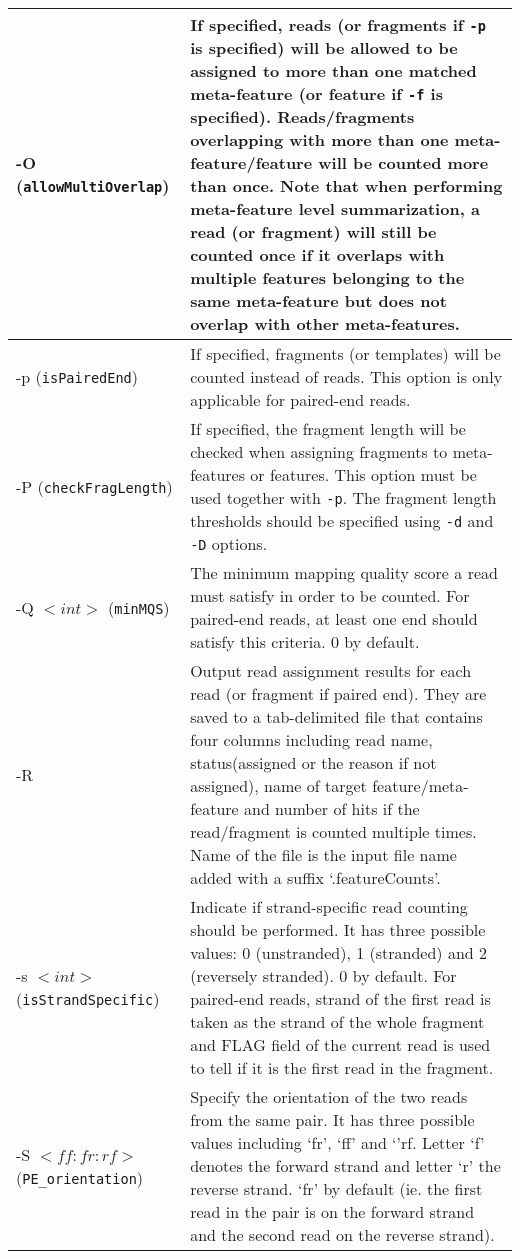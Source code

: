 \documentclass[12pt]{report}
\newcommand{\code}[1]{{\small\texttt{#1}}}
\begin{document}
\begin{longtable}{|p{5cm}|p{11cm}|}
\hline
-O \newline (\code{allowMultiOverlap}) & If specified, reads (or fragments if \code{-p} is specified) will be allowed to be assigned to more than one matched meta-feature (or feature if \code{-f} is specified). Reads/fragments overlapping with more than one meta-feature/feature will be counted more than once. Note that when performing meta-feature level summarization, a read (or fragment) will still be counted once if it overlaps with multiple features belonging to the same meta-feature but does not overlap with other meta-features. \\
\hline
-p \newline (\code{isPairedEnd}) & If specified, fragments (or templates) will be counted instead of reads. This option is only applicable for paired-end reads.\\
\hline
-P \newline (\code{checkFragLength}) & If specified, the fragment length will be checked when assigning fragments to meta-features or features. This option must be used together with \code{-p}. The fragment length thresholds should be specified using \code{-d} and \code{-D} options.\\
\hline
-Q $<int>$ \newline (\code{minMQS}) & The minimum mapping quality score a read must satisfy in order to be counted. For paired-end reads, at least one end should satisfy this criteria. 0 by default.\\
\hline
-R & Output read assignment results for each read (or fragment if paired end). They are saved to a tab-delimited file that contains four columns including read name, status(assigned or the reason if not assigned), name of target feature/meta-feature and number of hits if the read/fragment is counted multiple times. Name of the file is the input file name added with a suffix `.featureCounts'.\\
\hline
-s $<int>$ \newline (\code{isStrandSpecific}) & Indicate if strand-specific read counting should be performed. It has three possible values:  0 (unstranded), 1 (stranded) and 2 (reversely stranded). 0 by default. For paired-end reads, strand of the first read is taken as the strand of the whole fragment and FLAG field of the current read is used to tell if it is the first read in the fragment.\\
\hline
-S $<ff:fr:rf>$ \newline (\code{PE\_orientation}) & Specify the orientation of the two reads from the same pair. It has three possible values including `fr', `ff' and `'rf. Letter `f' denotes the forward strand and letter `r' the reverse strand. `fr' by default (ie. the first read in the pair is on the forward strand and the second read on the reverse strand).\\

\end{longtable}
\end{document}
